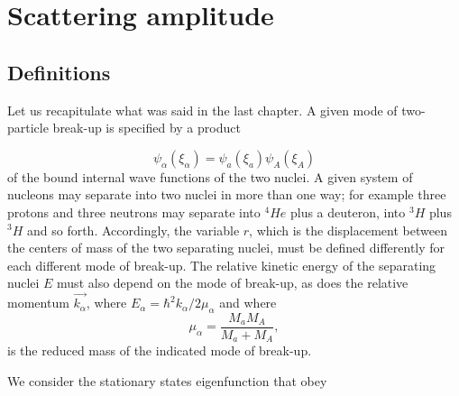 
\chapter{Scattering amplitude}
\section{Definitions}
Let us recapitulate what was said in the last chapter. A given mode of two-particle break-up is specified by a product

\begin{equation}
\psi_{\alpha}(\xi_{\alpha}) = \psi_a (\xi_a) \psi_A (\xi_A)
\end{equation}
 of the bound internal wave functions of the two nuclei. A given system of nucleons may separate into two nuclei in more than one way; for example three protons and three neutrons may separate into $^4 He$  plus a deuteron, into $^3 H$ plus $^3 H$ and so forth. Accordingly, the variable $r$, which is the displacement between the centers of mass of the two separating nuclei, must be defined differently for each different mode of break-up. The relative kinetic energy of the separating nuclei $E$ must also depend on the mode of break-up, as does the relative momentum $\vec{k_{\alpha}}$, where $E_{\alpha}=\hbar^2 k_{\alpha}/2\mu_{\alpha}$ and where
\begin{equation}
\mu_{\alpha} = \frac{M_a M_A}{M_a+M_A},
\end{equation}
 is the reduced mass of the indicated mode of break-up.

We consider the stationary states eigenfunction that obey

